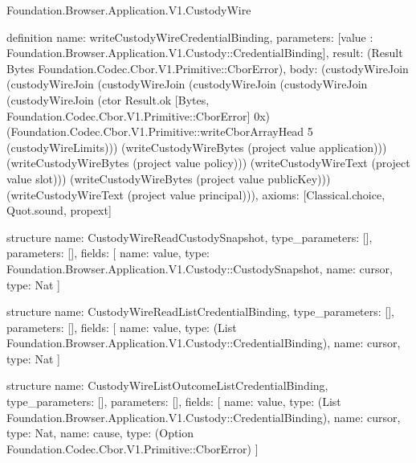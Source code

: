 \begin{lexlean}{Foundation.Browser.Application.V1.CustodyWire}
\begin{semanticmodule}
definition{
  name: writeCustodyWireCredentialBinding,
  parameters: [value : Foundation.Browser.Application.V1.Custody::CredentialBinding],
  result: (Result Bytes Foundation.Codec.Cbor.V1.Primitive::CborError),
  body: (custodyWireJoin (custodyWireJoin (custodyWireJoin (custodyWireJoin (custodyWireJoin (custodyWireJoin (ctor Result.ok [Bytes, Foundation.Codec.Cbor.V1.Primitive::CborError] 0x) (Foundation.Codec.Cbor.V1.Primitive::writeCborArrayHead 5 (custodyWireLimits))) (writeCustodyWireBytes (project value application))) (writeCustodyWireBytes (project value policy))) (writeCustodyWireText (project value slot))) (writeCustodyWireBytes (project value publicKey))) (writeCustodyWireText (project value principal))),
  axioms: [Classical.choice, Quot.sound, propext]
}

structure{
  name: CustodyWireReadCustodySnapshot,
  type_parameters: [],
  parameters: [],
  fields: [
    {name: value, type: Foundation.Browser.Application.V1.Custody::CustodySnapshot},
    {name: cursor, type: Nat}
  ]
}

structure{
  name: CustodyWireReadListCredentialBinding,
  type_parameters: [],
  parameters: [],
  fields: [
    {name: value, type: (List Foundation.Browser.Application.V1.Custody::CredentialBinding)},
    {name: cursor, type: Nat}
  ]
}

structure{
  name: CustodyWireListOutcomeListCredentialBinding,
  type_parameters: [],
  parameters: [],
  fields: [
    {name: value, type: (List Foundation.Browser.Application.V1.Custody::CredentialBinding)},
    {name: cursor, type: Nat},
    {name: cause, type: (Option Foundation.Codec.Cbor.V1.Primitive::CborError)}
  ]
}


\end{semanticmodule}
\end{lexlean}
